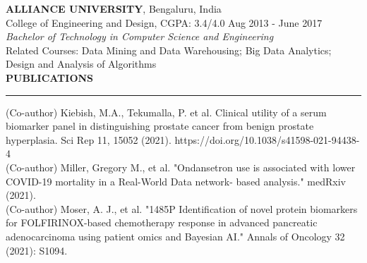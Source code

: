 \documentclass[a4paper]{article}
\newcommand{\myline}{\par
  \kern2pt %
  \hrule height 0.5pt
  \kern2pt %
}
\newcommand{\mybullet}{
	\indent 
  \textbullet \hspace*{2mm}
}
\begin{document}
 	\noindent
	\textbf{ALLIANCE UNIVERSITY}, Bengaluru, India \\
  College of Engineering and Design, CGPA: 3.4/4.0 \hfill Aug 2013 - June 2017 \\
	\textit{Bachelor of Technology in Computer Science and Engineering} \\
  Related Courses: Data Mining and Data Warehousing; Big Data Analytics; Design and Analysis of Algorithms \\

	\noindent
	{\large \textbf{PUBLICATIONS}}
	\myline 
	\smallskip

  \mybullet (Co-author) Kiebish, M.A., Tekumalla, P. et al. Clinical utility of a serum biomarker panel in distinguishing 
  prostate \hspace*{10mm}cancer from benign prostate hyperplasia. Sci Rep 11, 15052 (2021). https://doi.org/10.1038/s41598-021-94438-4 \\
  \mybullet (Co-author) Miller, Gregory M., et al. "Ondansetron use is associated with lower COVID-19 mortality in a Real-World Data \hspace*{10mm}network-
  based analysis." medRxiv (2021). \\
  \mybullet (Co-author) Moser, A. J., et al. "1485P Identification of novel protein biomarkers for FOLFIRINOX-based chemotherapy \hspace*{10mm}response in advanced pancreatic adenocarcinoma using patient omics and Bayesian AI." Annals of Oncology 32 (2021): \hspace*{10mm}S1094.\\
	
\newpage
	
	
\end{document}
